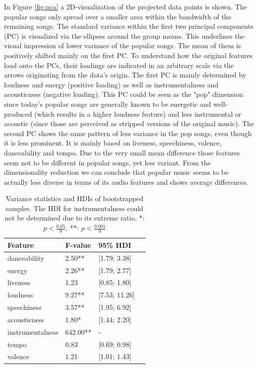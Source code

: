 \documentclass{article}
\begin{document}
In Figure \ref{fig:pca} a 2D-visualization of the projected data points is shown. The popular songs only spread over a smaller area within the bandwidth of the remaining songs. The standard variance within the first two principal components (PC) is visualized via the ellipses around the group means. This underlines the visual impression of lower variance of the popular songs. The mean of them is positively shifted mainly on the first PC. To understand how the original features load onto the PCs, their loadings are indicated in an arbitrary scale via the arrows originating from the data's origin. The first PC is mainly determined by loudness and energy (positive loading) as well as instrumentalness and acousticness (negative loading). This PC could be seen as the "pop" dimension since today's popular songs are generally known to be energetic and well-produced (which results in a higher loudness feature) and less instrumental or acoustic (since those are perceived as stripped versions of the original music). The second PC shows the same pattern of less variance in the pop songs, even though it is less prominent. It is mainly based on liveness, speechiness, valence, danceability and tempo. Due to the very small mean difference those features seem not to be different in popular songs, yet less variant. From the dimensionality reduction we can conclude that popular music seems to be actually less diverse in terms of its audio features and shows average differences.

\begin{table}[h!]
  
  \label{tab:var}
  \centering
  \begin{tabular}{lllc}
    \toprule
    Feature     & F-value & 95\% HDI\\
    \midrule
	danceability        	&  2.50** & [1.79; 3.38]\\
	energy              		&  2.26** & [1.79; 2.77]\\
	liveness            		&  1.23   & [0.85; 1.80]\\
	loudness            	&  9.27** & [7.53; 11.26]\\
	speechiness         	&  3.57** & [1.95; 6.92]\\
	acousticness        	&  1.80*  & [1.44; 2.20]\\
	instrumentalness    	&642.00** & -\\
	tempo               		&  0.83   & [0.69; 0.98]\\
	valence             	&  1.21   & [1.01; 1.43]\\
    \bottomrule
  \end{tabular}
  \vspace*{2mm}
  \caption{Variance statistics and HDIs of bootstrapped samples. The HDI for instrumentalness could not be determined due to its extreme ratio. *: $p<\frac{0.05}{9}$, **: $p<\frac{0.001}{9}$}
\end{table}
\end{document}
